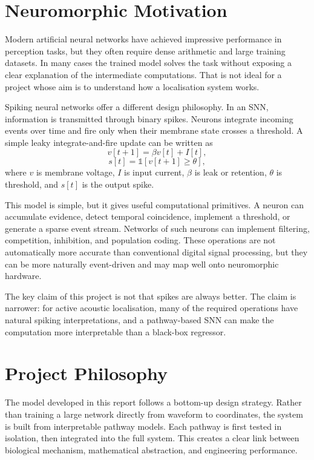 \section{Neuromorphic Motivation}

Modern artificial neural networks have achieved impressive performance in perception tasks, but they often require dense arithmetic and large training datasets. In many cases the trained model solves the task without exposing a clear explanation of the intermediate computations. That is not ideal for a project whose aim is to understand how a localisation system works.

Spiking neural networks offer a different design philosophy. In an SNN, information is transmitted through binary spikes. Neurons integrate incoming events over time and fire only when their membrane state crosses a threshold. A simple leaky integrate-and-fire update can be written as
\begin{equation}
    v[t+1] = \beta v[t] + I[t],
\end{equation}
\begin{equation}
    s[t] = \mathbb{1}\left[v[t+1]\geq \theta\right],
\end{equation}
where $v$ is membrane voltage, $I$ is input current, $\beta$ is leak or retention, $\theta$ is threshold, and $s[t]$ is the output spike.

This model is simple, but it gives useful computational primitives. A neuron can accumulate evidence, detect temporal coincidence, implement a threshold, or generate a sparse event stream. Networks of such neurons can implement filtering, competition, inhibition, and population coding. These operations are not automatically more accurate than conventional digital signal processing, but they can be more naturally event-driven and may map well onto neuromorphic hardware.

The key claim of this project is not that spikes are always better. The claim is narrower: for active acoustic localisation, many of the required operations have natural spiking interpretations, and a pathway-based SNN can make the computation more interpretable than a black-box regressor.

\section{Project Philosophy}

The model developed in this report follows a bottom-up design strategy. Rather than training a large network directly from waveform to coordinates, the system is built from interpretable pathway models. Each pathway is first tested in isolation, then integrated into the full system. This creates a clear link between biological mechanism, mathematical abstraction, and engineering performance.

